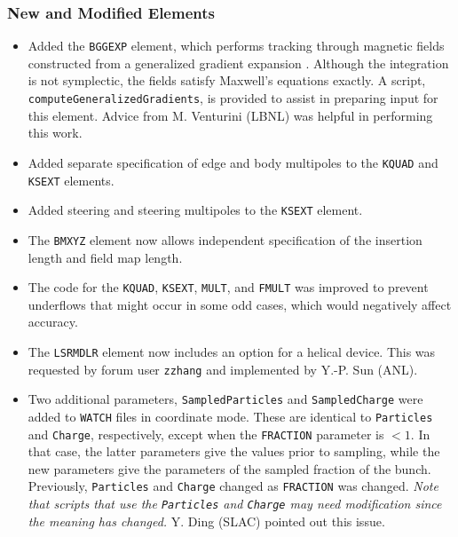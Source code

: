 \documentclass[11pt]{article}
\begin{document}
\subsubsection{New and Modified Elements}
\begin{itemize}
\item Added the \verb|BGGEXP| element, which performs tracking through magnetic fields constructed from a generalized
  gradient expansion \cite{Venturini-NIMA427-387}. Although the integration is not symplectic, the fields satisfy Maxwell's equations exactly.
  A script, \verb|computeGeneralizedGradients|, is provided to assist in preparing input for this element.
  Advice from M. Venturini (LBNL) was helpful in performing this work.
\item Added separate specification of edge and body multipoles to the \verb|KQUAD| and \verb|KSEXT| elements.
\item Added steering and steering multipoles to the \verb|KSEXT| element.
\item The \verb|BMXYZ| element now allows independent specification of the insertion length and field map length.
\item The code for the \verb|KQUAD|, \verb|KSEXT|, \verb|MULT|, and \verb|FMULT| was improved to prevent underflows that might occur in some
  odd cases, which would negatively affect accuracy.
\item The \verb|LSRMDLR| element now includes an option for a helical device. This was requested by forum user \verb|zzhang| and implemented by
  Y.-P. Sun (ANL).
\item Two additional parameters, \verb|SampledParticles| and \verb|SampledCharge| were added to \verb|WATCH| files in coordinate mode. 
  These are identical to \verb|Particles| and \verb|Charge|, respectively, except when the \verb|FRACTION| parameter is $<1$.
  In that case, the latter parameters give the values prior to sampling, while the new parameters give the parameters of the
  sampled fraction of the bunch. Previously,  \verb|Particles| and \verb|Charge| changed as \verb|FRACTION| was changed. 
  {\em Note that scripts that use the  \verb|Particles| and \verb|Charge| may need modification since the meaning has changed.}
  Y. Ding (SLAC) pointed out this issue.
\end{itemize}
\end{document}
